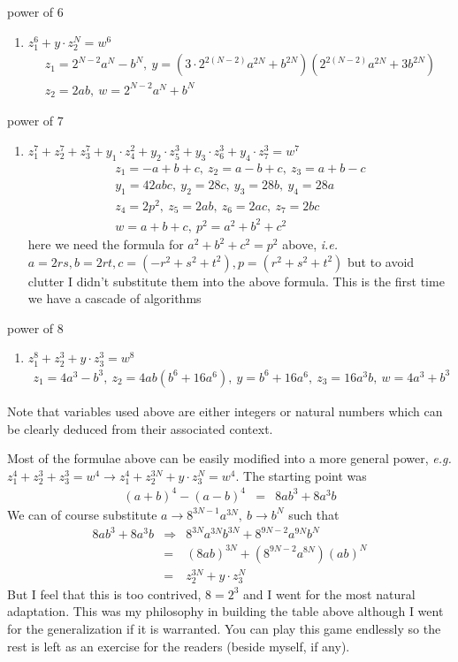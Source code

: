 \documentclass[aps,preprint,preprintnumbers,nofootinbib,showpacs,prd]{revtex4-1}
\newcommand{\ie}{{\it i.e.} }
\newcommand{\eg}{{\it e.g.} }
\newcommand{\nbea}{\begin{eqnarray*}}
\newcommand{\neea}{\end{eqnarray*}}
\begin{document}
\item power of 6
\begin{enumerate}
	\item $z_1^6 + y \cdot z_2^N = w^6$
	\nbea
	&z_1 = 2^{N-2}a^N - b^N, ~ y = (3 \cdot 2^{2(N-2)}a^{2N} + b^{2N})(2^{2(N-2)}a^{2N} + 3 b^{2N})&\\
	&z_2 = 2 a b, ~ w = 2^{N-2}a^N + b^N&
	\neea
\end{enumerate}
\item power of 7
\begin{enumerate}
	\item $z_1^7 + z_2^7 + z_3^7  + y_1 \cdot z_4^2 + y_2 \cdot z_5^3 + y_3 \cdot z_6^3 + y_4 \cdot z_7^3= w^7$
	\nbea
	&z_1 = -a+b+c, ~ z_2 = a-b+c, ~ z_3 = a+b-c& \\
	&y_1 = 42 abc, ~ y_2 = 28 c, ~ y_3 = 28 b, ~ y_4 = 28 a& \\
	&z_4 = 2 p^2, ~ z_5 = 2 ab, ~ z_6 = 2 ac, ~z_7 = 2 bc& \\
	&w = a+b+c, ~ p^2 = a^2 + b^2 + c^2&
	\neea
	here we need the formula for $a^2 + b^2 + c^2 = p^2$ above, \ie $a = 2rs, b = 2rt, c = (-r^2 + s^2 + t^2), p = (r^2 + s^2 + t^2)$ but to avoid clutter I didn't substitute them into the above formula. This is the first time we have a cascade of algorithms
\end{enumerate}
\item power of 8
\begin{enumerate}
	\item $z_1^8 + z_2^3 + y \cdot z_3^3 = w^8$
	\nbea
	z_1 = 4 a^3 - b^3, ~ z_2 = 4 a b (b^6 + 16 a^6), ~y = b^6 + 16 a^6, ~ z_3 = 16 a^3 b, ~ w = 4 a^3 + b^3
	\neea
\end{enumerate}

Note that variables used above are either integers or natural numbers which can be clearly deduced from their associated context.

Most of the formulae above can be easily modified into a more general power, \eg $z_1^4 + z_2^3 + z_3^3 = w^4 \longrightarrow z_1^4 + z_2^{3N} + y \cdot z_3^N = w^4$. The starting point was
%
\nbea
(a+b)^4 - (a-b)^4 & = & 8 a b^3 + 8 a^3 b
\neea
%
We can of course substitute $a \rightarrow 8^{3N-1} a^{3N}, ~ b \rightarrow b^N$ such that
%
\nbea
8 a b^3 + 8 a^3 b & \Rightarrow & 8^{3N} a^{3N} b^{3N} + 8^{9N-2} a^{9N} b^N \\
& = & (8ab)^{3N} + (8^{9N-2} a^{8N}) (a b)^N \\
& = & z_2^{3N} + y \cdot z_3^N
\neea
%
But I feel that this is too contrived, $8 = 2^3$ and I went for the most natural adaptation. This was my philosophy in building the table above although I went for the generalization if it is warranted. You can play this game endlessly so the rest is left as an exercise for the readers (beside myself, if any).
\end{document}
